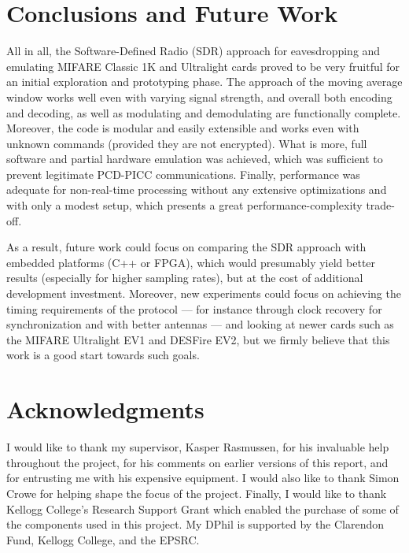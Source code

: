 \documentclass[fleqn,10pt]{SelfArx} %
\begin{document}
\section{Conclusions and Future Work}
\label{sec:conclusions}

All in all, the Software-Defined Radio (SDR) approach for eavesdropping and emulating MIFARE Classic 1K and Ultralight cards proved to be very fruitful for an initial exploration and prototyping phase. The approach of the moving average window works well even with varying signal strength, and overall both encoding and decoding, as well as modulating and demodulating are functionally complete. Moreover, the code is modular and easily extensible and works even with unknown commands (provided they are not encrypted). What is more, full software and partial hardware emulation was achieved, which was sufficient to prevent legitimate PCD-PICC communications. Finally, performance was adequate for non-real-time processing without any extensive optimizations and with only a modest setup, which presents a great performance-complexity trade-off.

As a result, future work could focus on comparing the SDR approach with embedded platforms (C++ or FPGA), which would presumably yield better results (especially for higher sampling rates), but at the cost of additional development investment. Moreover, new experiments could focus on achieving the timing requirements of the protocol --- for instance through clock recovery for synchronization and with better antennas --- and looking at newer cards such as the MIFARE Ultralight EV1 and DESFire EV2, but we firmly believe that this work is a good start towards such goals.


\section*{Acknowledgments} %

I would like to thank my supervisor, Kasper Rasmussen, for his invaluable help throughout the project, for his comments on earlier versions of this report, and for entrusting me with his expensive equipment. I would also like to thank Simon Crowe for helping shape the focus of the project. Finally, I would like to thank Kellogg College's Research Support Grant which enabled the purchase of some of the components used in this project. My DPhil is supported by the Clarendon Fund, Kellogg College, and the EPSRC.
\end{document}
